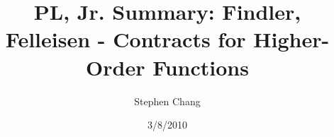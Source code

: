 \documentclass[12pt]{article}	%
\begin{document}
\title{PL, Jr. Summary: Findler, Felleisen - Contracts for Higher-Order Functions}
\author{Stephen Chang}
\date{3/8/2010}
\maketitle
\end{document}
